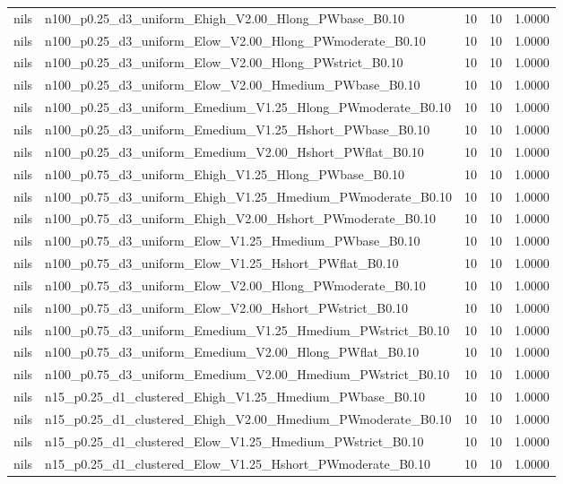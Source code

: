 \begin{tabular}{llrrr}
nils & n100_p0.25_d3_uniform_Ehigh_V2.00_Hlong_PWbase_B0.10 & 10 & 10 & 1.0000 \\
nils & n100_p0.25_d3_uniform_Elow_V2.00_Hlong_PWmoderate_B0.10 & 10 & 10 & 1.0000 \\
nils & n100_p0.25_d3_uniform_Elow_V2.00_Hlong_PWstrict_B0.10 & 10 & 10 & 1.0000 \\
nils & n100_p0.25_d3_uniform_Elow_V2.00_Hmedium_PWbase_B0.10 & 10 & 10 & 1.0000 \\
nils & n100_p0.25_d3_uniform_Emedium_V1.25_Hlong_PWmoderate_B0.10 & 10 & 10 & 1.0000 \\
nils & n100_p0.25_d3_uniform_Emedium_V1.25_Hshort_PWbase_B0.10 & 10 & 10 & 1.0000 \\
nils & n100_p0.25_d3_uniform_Emedium_V2.00_Hshort_PWflat_B0.10 & 10 & 10 & 1.0000 \\
nils & n100_p0.75_d3_uniform_Ehigh_V1.25_Hlong_PWbase_B0.10 & 10 & 10 & 1.0000 \\
nils & n100_p0.75_d3_uniform_Ehigh_V1.25_Hmedium_PWmoderate_B0.10 & 10 & 10 & 1.0000 \\
nils & n100_p0.75_d3_uniform_Ehigh_V2.00_Hshort_PWmoderate_B0.10 & 10 & 10 & 1.0000 \\
nils & n100_p0.75_d3_uniform_Elow_V1.25_Hmedium_PWbase_B0.10 & 10 & 10 & 1.0000 \\
nils & n100_p0.75_d3_uniform_Elow_V1.25_Hshort_PWflat_B0.10 & 10 & 10 & 1.0000 \\
nils & n100_p0.75_d3_uniform_Elow_V2.00_Hlong_PWmoderate_B0.10 & 10 & 10 & 1.0000 \\
nils & n100_p0.75_d3_uniform_Elow_V2.00_Hshort_PWstrict_B0.10 & 10 & 10 & 1.0000 \\
nils & n100_p0.75_d3_uniform_Emedium_V1.25_Hmedium_PWstrict_B0.10 & 10 & 10 & 1.0000 \\
nils & n100_p0.75_d3_uniform_Emedium_V2.00_Hlong_PWflat_B0.10 & 10 & 10 & 1.0000 \\
nils & n100_p0.75_d3_uniform_Emedium_V2.00_Hmedium_PWstrict_B0.10 & 10 & 10 & 1.0000 \\
nils & n15_p0.25_d1_clustered_Ehigh_V1.25_Hmedium_PWbase_B0.10 & 10 & 10 & 1.0000 \\
nils & n15_p0.25_d1_clustered_Ehigh_V2.00_Hmedium_PWmoderate_B0.10 & 10 & 10 & 1.0000 \\
nils & n15_p0.25_d1_clustered_Elow_V1.25_Hmedium_PWstrict_B0.10 & 10 & 10 & 1.0000 \\
nils & n15_p0.25_d1_clustered_Elow_V1.25_Hshort_PWmoderate_B0.10 & 10 & 10 & 1.0000 \\

\end{tabular}
